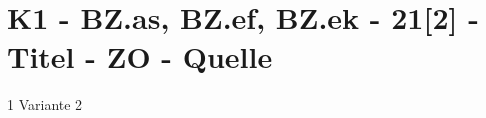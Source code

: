 \section{K1 - BZ.as, BZ.ef, BZ.ek - 21[2] - Titel - ZO - Quelle}

\begin{langesbeispiel}\item[1] %
Variante 2

\end{langesbeispiel}